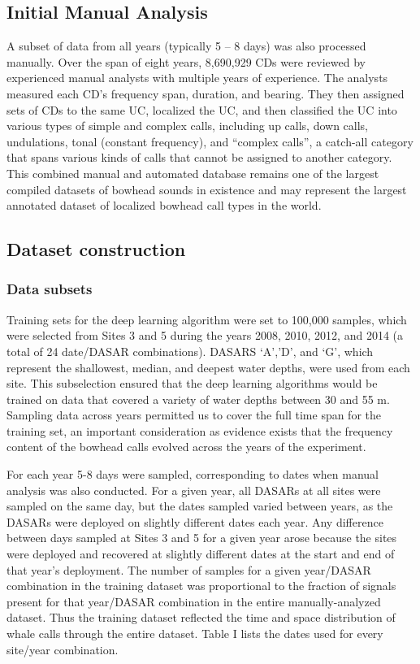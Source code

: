 \documentclass[preprint,NumberedRefs]{JASAnew}
\begin{document}
\subsection{Initial Manual Analysis}

A subset of data from all years (typically 5 – 8 days) was also processed manually. Over the span of eight years, 8,690,929 CDs were reviewed by experienced manual analysts with multiple years of experience.  The analysts measured each CD's frequency span, duration, and bearing.  They then assigned sets of CDs to the same UC, localized the UC, and then classified the UC into various types of simple and complex calls, including up calls, down calls, undulations, tonal (constant frequency), and “complex calls”, a catch-all category that spans various kinds of calls that cannot be assigned to another category.  This combined manual and automated database remains one of the largest compiled datasets of bowhead sounds in existence and may represent the largest annotated dataset of localized bowhead call types in the world.

\subsection{Dataset construction}
\subsubsection{Data subsets}
Training sets for the deep learning algorithm were set to 100,000 samples, which were selected from Sites 3 and 5 during the years 2008, 2010, 2012, and 2014 (a total of 24 date/DASAR combinations).  DASARS ‘A’,’D’, and ‘G’, which represent the shallowest, median, and deepest water depths, were used from each site.   This subselection ensured that the deep learning algorithms would be trained on data that covered a variety of water depths between 30 and 55 m.   Sampling data across years permitted us to cover the full time span for the training set, an important consideration as evidence exists that the frequency content of the bowhead calls evolved across the years of the experiment\cite{thode2017decadal}.  

For each year 5-8 days were sampled, corresponding to dates when manual analysis was also conducted.  For a given year, all DASARs at all sites were sampled on the same day, but the dates sampled varied between years, as the DASARs were deployed on slightly different dates each year.  Any difference between days sampled at Sites 3 and 5 for a given year arose because the sites were deployed and recovered at slightly different dates at the start and end of that year’s deployment.  The number of samples for a given year/DASAR combination in the training dataset was proportional to the fraction of signals present for that year/DASAR combination in the entire manually-analyzed dataset.  Thus the training dataset reflected the time and space distribution of whale calls through the entire dataset.  Table I lists the dates used for every site/year combination.  
\end{document}
